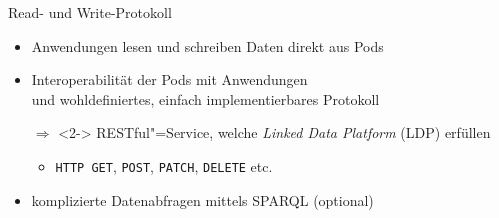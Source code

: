 \begin{frame}{Read- und Write-Protokoll \footnotesize\cite{mecklerWebLinkedData2023,sambraSolidPlatformDecentralized2016}}
    \begin{itemize}
        \item Anwendungen lesen und schreiben Daten direkt aus Pods
        \item Interoperabilität der Pods mit Anwendungen\\
            und wohldefiniertes, einfach implementierbares Protokoll
        

        \item[$\Rightarrow$]<2-> RESTful"=Service, welche \emph{Linked Data Platform} (LDP) erfüllen
        \begin{itemize}
            \item<2-> \texttt{HTTP GET}, \texttt{POST}, \texttt{PATCH}, \texttt{DELETE} etc.~\cite{sambraSolidPlatformDecentralized2016}
        \end{itemize}
        

        \item<3-> komplizierte Datenabfragen mittels SPARQL (optional)
    \end{itemize}

\end{frame}

